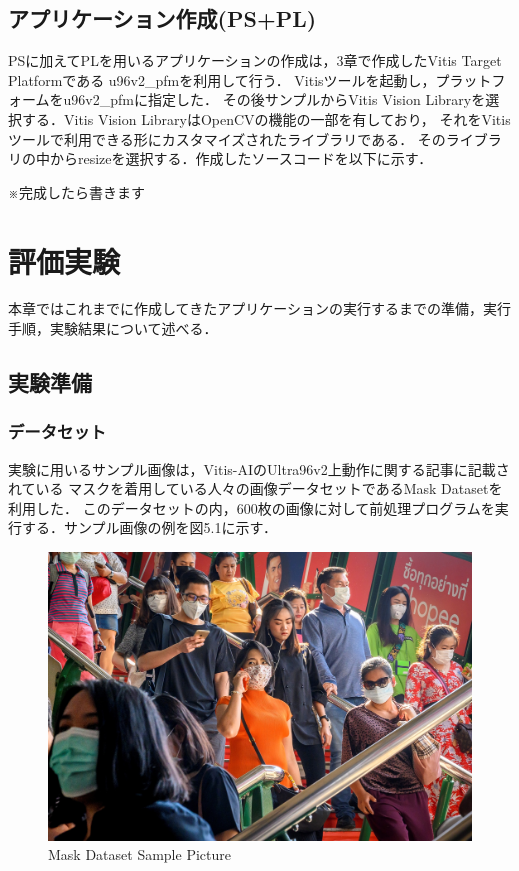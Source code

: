 \documentclass[11pt,a4j]{jreport}
\begin{document}
\section{アプリケーション作成(PS+PL)}
PSに加えてPLを用いるアプリケーションの作成は，3章で作成したVitis Target Platformである
u96v2_pfmを利用して行う．
Vitisツールを起動し，プラットフォームをu96v2_pfmに指定した．
その後サンプルからVitis Vision Libraryを選択する．Vitis Vision LibraryはOpenCVの機能の一部を有しており，
それをVitisツールで利用できる形にカスタマイズされたライブラリである．
そのライブラリの中からresizeを選択する．作成したソースコードを以下に示す．

※完成したら書きます

%
%
%
\chapter{評価実験}
本章ではこれまでに作成してきたアプリケーションの実行するまでの準備，実行手順，実験結果について述べる．
\section{実験準備}
\subsection{データセット}
実験に用いるサンプル画像は，Vitis-AIのUltra96v2上動作に関する記事\cite{SamplePictWeb}に記載されている
マスクを着用している人々の画像データセットであるMask Dataset\cite{SamplePictDrive}を利用した．
このデータセットの内，600枚の画像に対して前処理プログラムを実行する．サンプル画像の例を図5.1に示す．
\begin{figure}[H]
  \center
  \includegraphics[scale = 0.17]{pict/Mask_1.jpg}
  \caption{Mask Dataset Sample Picture}
\end{figure}
\end{document}
